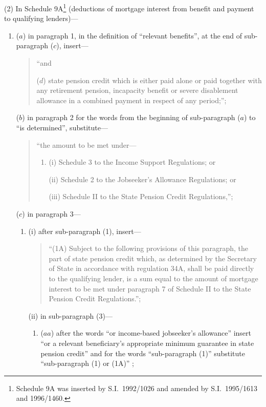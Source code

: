 \documentclass[12pt,a4paper]{article}
\begin{document}
(2) In Schedule 9A\footnote{Schedule 9A was inserted by S.I.\ 1992/1026 and amended by S.I.\ 1995/1613 and 1996/1460.} (deductions of mortgage interest from benefit and payment to qualifying lenders)—
\begin{enumerate}\item[]
($a$) in paragraph 1, in the definition of “relevant benefits”, at the end of sub-paragraph ($c$), insert—
\begin{quotation}
    “and

    ($d$) 
    state pension credit which is either paid alone or paid together with any retirement pension, incapacity benefit or severe disablement allowance in a combined payment in respect of any period;”; 
\end{quotation}

($b$) in paragraph 2 for the words from the beginning of sub-paragraph ($a$)  to “is determined”, substitute—
\begin{quotation}
    “the amount to be met under—
\begin{enumerate}\item[]
    (i) 
    Schedule 3 to the Income Support Regulations; or

    (ii) 
    Schedule 2 to the Jobseeker’s Allowance Regulations; or

    (iii) 
    Schedule II to the State Pension Credit Regulations,”; 
\end{enumerate}
\end{quotation}

($c$) in paragraph 3—
\begin{enumerate}\item[]
(i) after sub-paragraph (1), insert—
\begin{quotation}
“(1A) Subject to the following provisions of this paragraph, the part of state pension credit which, as determined by the Secretary of State in accordance with regulation 34A, shall be paid directly to the qualifying lender, is a sum equal to the amount of mortgage interest to be met under paragraph 7 of Schedule II to the State Pension Credit Regulations.”;
\end{quotation}

(ii) in sub-paragraph (3)—
\begin{enumerate}\item[]
($aa$) after the words “or income-based jobseeker’s allowance” insert “or a relevant beneficiary’s appropriate minimum guarantee in state pension credit” and for the words “sub-paragraph (1)” substitute “sub-paragraph (1) or (1A)” ;


\end{enumerate}
\end{enumerate}
\end{enumerate}
\end{document}
